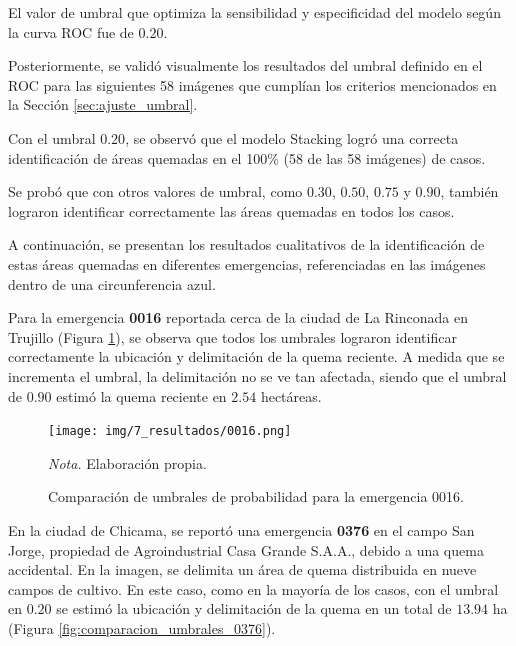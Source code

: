 El valor de umbral que optimiza la sensibilidad y especificidad del modelo según la curva ROC fue de 
$0.20$.

Posteriormente, se validó visualmente los resultados del umbral definido en el ROC para las siguientes 
58 imágenes que cumplían los criterios mencionados en la Sección \ref{sec:ajuste_umbral}.

Con el umbral $0.20$, se observó que el modelo Stacking logró una correcta identificación de áreas quemadas en 
el 100\% (58 de las 58 imágenes) de casos. 

Se probó que con otros valores de umbral, como $0.30$, $0.50$, $0.75$ y $0.90$, también lograron identificar
correctamente las áreas quemadas en todos los casos. 

A continuación, se presentan los resultados cualitativos
de la identificación de estas áreas quemadas en diferentes emergencias, referenciadas en las imágenes dentro de una circunferencia azul.

Para la emergencia \textbf{0016} reportada cerca de la ciudad de La Rinconada en Trujillo (Figura \ref{fig:comparacion_umbrales}),
se observa que todos los umbrales lograron identificar correctamente la ubicación y delimitación de la quema reciente. A medida que se incrementa 
el umbral, la delimitación no se ve tan afectada, siendo que el umbral de $0.90$ estimó la quema reciente en $2.54$ hectáreas.

\begin{figure}[H]
    \centering
    \caption{Comparación de umbrales de probabilidad para la emergencia 0016.}
    \label{fig:comparacion_umbrales}
    \texttt{[image: img/7\_resultados/0016.png]}
    \begin{flushleft}
        \vspace{-\baselineskip}
        \textit{Nota.} Elaboración propia.
        \vspace{-\baselineskip}
    \end{flushleft}
\end{figure}

En la ciudad de Chicama, se reportó una emergencia \textbf{0376} en el campo San Jorge, propiedad de Agroindustrial Casa Grande S.A.A., debido a una quema accidental. 
En la imagen, se delimita un área de quema distribuida en nueve campos de cultivo. En este caso, como en la mayoría de los casos, con el umbral en $0.20$ se estimó la 
ubicación y delimitación de la quema en un total de $13.94$ ha (Figura \ref{fig:comparacion_umbrales_0376}).

